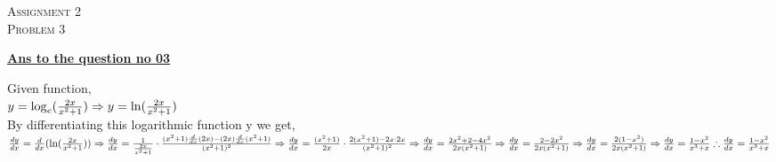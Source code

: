 \documentclass{article}
\begin{document}
\begin{newpage}
\begin{flushright}
    \textsc{Assignment 2}\\
    \textsc{Problem 3}\\
    [1 cm]
    \end{flushright}
\begin{center}
  \textbf{\Large \underline {Ans to the question no 03}}\\
  [1 cm]
\end{center}
\Large {Given function,\\[3mm]
$ y=\log _{e} (\frac{2x}{x^2+1})\\[3mm]
\Rightarrow y= \ln (\frac{2x}{x^2+1})$\\[5mm]
By differentiating this logarithmic function y we get,\\[3mm]
$ \frac{dy}{dx}=\frac{d}{dx} (\ln (\frac{2x}{x^2+1}))\\[3mm]
\Rightarrow \frac{dy}{dx}=\frac{1}{\frac{2x}{x^2+1}} \cdot \frac{(x^2+1) \frac{d}{dx}(2x)-(2x)\frac{d}{dx}(x^2+1)}{(x^2+1)^2}\\[3mm]
\Rightarrow \frac{dy}{dx}=\frac{(x^2+1)}{2x} \cdot \frac{2(x^2+1)-2x\cdot2x}{(x^2+1)^2}\\[3mm]
\Rightarrow \frac{dy}{dx}=\frac{2x^2+2-4x^2}{2x(x^2+1)}\\[3mm]
\Rightarrow \frac{dy}{dx}=\frac{2-2x^2}{2x(x^2+1)}\\[3mm]
\Rightarrow \frac{dy}{dx}=\frac{2(1-x^2)}{2x(x^2+1)}\\[3mm]
\Rightarrow \frac{dy}{dx}=\frac{1-x^2}{x^3+x}\\[3mm]
\therefore \frac{dy}{dx}=\frac{1-x^2}{x^3+x}$}
\end{newpage}
\end{document}
